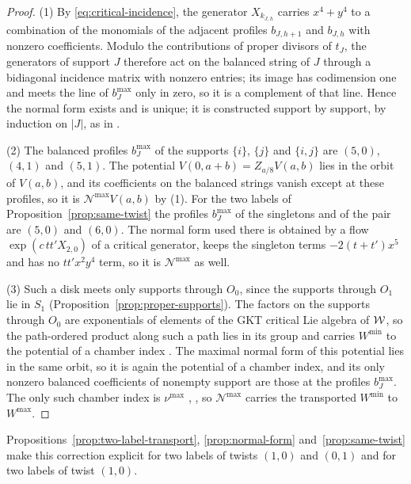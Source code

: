 \begin{proof}
(1) By \eqref{eq:critical-incidence}, the generator $X_{k_{J,h}}$ carries
$x^4+y^4$ to a combination of the monomials of the adjacent profiles
$b_{J,h+1}$ and $b_{J,h}$ with nonzero coefficients.  Modulo the
contributions of proper divisors of $t_J$, the generators of support $J$
therefore act on the balanced string of $J$ through a bidiagonal incidence
matrix with nonzero entries; its image has codimension one and meets the
line of $b_J^{\max}$ only in zero, so it is a complement of that line.
Hence the normal form exists and is unique; it is constructed support by
support, by induction on $|J|$, as in \cite[Thm.~1.1]{wuebben2026boundary}.

(2) The balanced profiles $b_J^{\max}$ of the supports $\{i\}$, $\{j\}$ and
$\{i,j\}$ are $(5,0)$, $(4,1)$ and $(5,1)$.  The potential
$V(0,a+b)=Z_{a/8}V(a,b)$ lies in the orbit of $V(a,b)$, and its
coefficients on the balanced strings vanish except at these profiles, so it is
$\mathcal N^{\max}V(a,b)$ by (1).  For the two labels of
Proposition~\ref{prop:same-twist} the profiles $b_J^{\max}$ of the singletons
and of the pair are $(5,0)$ and $(6,0)$.  The normal form used there is
obtained by a flow $\exp(c\,tt'X_{2,0})$ of a critical generator, keeps the
singleton terms $-2(t+t')x^5$ and has no $tt'x^2y^4$ term, so it is
$\mathcal N^{\max}$ as well.

(3) Such a disk meets only supports through $O_0$, since the supports
through $O_1$ lie in $S_1$ (Proposition~\ref{prop:proper-supports}).  The
factors on the supports through $O_0$ are exponentials of elements of the
GKT critical Lie algebra of $\mathcal W$, so the path-ordered product along such a path
lies in its group and carries $W^{\min}$ to the potential of a chamber index
\cite[Thm.~4.27]{grossetal2022open}.  The maximal normal form of this
potential lies in the same orbit, so it is again the potential of a chamber
index, and its only nonzero balanced coefficients of nonempty support are
those at the profiles $b_J^{\max}$.  The only such chamber index is
$\nu^{\max}$ \cite[Thm.~1.1]{wuebben2026boundary},
\cite[Cor.~5.14]{grossetal2022open}, so $\mathcal N^{\max}$ carries the
transported $W^{\min}$ to $W^{\max}$.
\end{proof}

Propositions~\ref{prop:two-label-transport}, \ref{prop:normal-form}
and~\ref{prop:same-twist} make this correction explicit for two labels of
twists $(1,0)$ and $(0,1)$ and for two labels of twist $(1,0)$.

